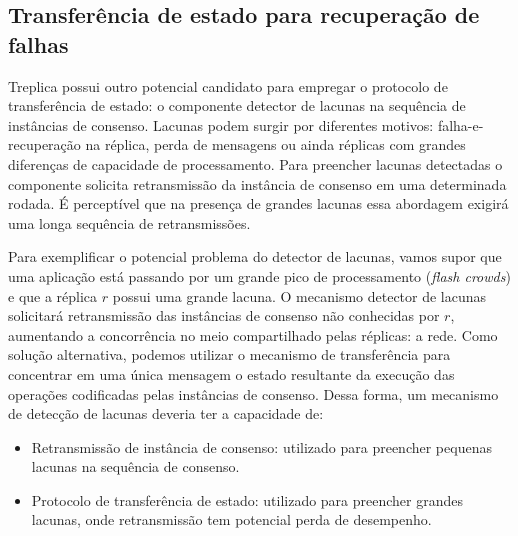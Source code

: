 \subsection{Transferência de estado para recuperação de falhas}

Treplica possui outro potencial candidato para empregar o protocolo de transferência de
estado: o componente detector de lacunas na sequência de instâncias de consenso. Lacunas
podem surgir por diferentes motivos: falha-e-recuperação na réplica, perda de mensagens ou
ainda réplicas com grandes diferenças de capacidade de processamento. Para preencher
lacunas detectadas o componente solicita retransmissão da instância de consenso em uma
determinada rodada. É perceptível que na presença de grandes lacunas essa abordagem
exigirá uma longa sequência de retransmissões.

Para exemplificar o potencial problema do detector de lacunas, vamos supor que uma
aplicação está passando por um grande pico de processamento (\emph{flash crowds}) e que a
réplica $r$ possui uma grande lacuna. O mecanismo detector de lacunas solicitará
retransmissão das instâncias de consenso não conhecidas por $r$, aumentando a concorrência
no meio compartilhado pelas réplicas: a rede. Como solução alternativa, podemos utilizar o
mecanismo de transferência para concentrar em uma única mensagem o estado resultante da
execução das operações codificadas pelas instâncias de consenso. Dessa forma, um mecanismo
de detecção de lacunas deveria ter a capacidade de:

\begin{itemize}
  \item Retransmissão de instância de consenso: utilizado para preencher pequenas lacunas
    na sequência de consenso.
  \item Protocolo de transferência de estado: utilizado para preencher grandes lacunas,
    onde retransmissão tem potencial perda de desempenho.
\end{itemize}

